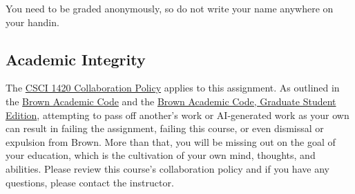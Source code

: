 \documentclass{article}
\begin{document}
You need to be graded anonymously, so do not write your name anywhere on your handin.

\subsection*{Academic Integrity}
The \href{https://docs.google.com/document/d/1V2w_oecqWRg0Zb9IWdG-5NzGnYnX55G5SG0Pf5jD0N4/edit?usp=sharing}{CSCI 1420 Collaboration Policy} applies to this assignment.
As outlined in the \href{https://college.brown.edu/design-your-education/academic-policies/academic-code}{Brown Academic Code} and the \href{https://graduateschool.brown.edu/academics-research/rules-regulations/academic-code}{Brown Academic Code, Graduate Student Edition}, attempting to pass off another's work or AI-generated work as your own can result in failing the assignment, failing this course, or even dismissal or expulsion from Brown.  More than that, you will be missing out on the goal of your education, which is the cultivation of your own mind, thoughts, and abilities.  Please review this course's collaboration policy and if you have any questions, please contact the instructor.
\end{document}
